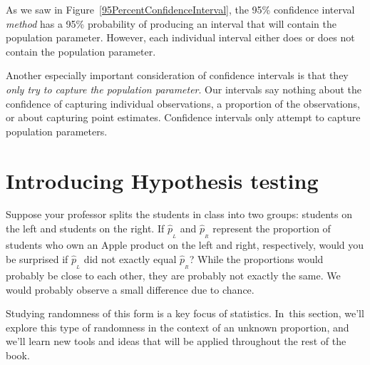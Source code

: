 As we saw in Figure~\ref{95PercentConfidenceInterval}, the 95\% confidence interval \emph{method} has a 95\% probability of producing an interval that will contain the population parameter.  However, each individual interval either does or does not contain the population parameter.

Another especially important consideration of confidence intervals is that they \emph{only try to capture the population parameter}. Our intervals say nothing about the confidence of capturing individual observations, a proportion of the observations, or about capturing point estimates. Confidence intervals only attempt to capture population parameters.


\section{Introducing Hypothesis testing}

\begin{example}{Suppose your professor splits the students in class into two groups: students on the left and students on the right. If $\hat{p}_{_L}$ and $\hat{p}_{_R}$ represent the proportion of students who own an Apple product on the left and right, respectively, would you be surprised if $\hat{p}_{_L}$ did not {exactly} equal $\hat{p}_{_R}$?}\label{classRightLeftSideApple}
While the proportions would probably be close to each other, they are probably not exactly the same. We would probably observe a small difference due to {chance}.
\end{example}


Studying randomness of this form is a key focus of statistics.   In~this section, we'll explore this type of randomness in the context of an unknown proportion, and we'll learn new tools and ideas that will be applied throughout the rest of the book.

